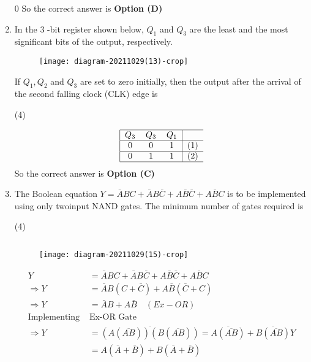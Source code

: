 \begin{enumerate}
\begin{answer}
\begin{figure}[H]
\end{figure}0
So the correct answer is \textbf{Option (D)}
\end{answer}
	\item In the 3 -bit register shown below, $Q_{1}$ and $Q_{3}$ are the least and the most significant bits of the output, respectively.\\
	\begin{figure}[H]
		\centering
		\texttt{[image: diagram-20211029(13)-crop]}
	\end{figure}
	If $Q_{1}, Q_{2}$ and $Q_{3}$ are set to zero initially, then the output after the arrival of the second falling clock (CLK) edge is
\begin{tasks}(4)
\end{tasks}
\begin{answer}
\begin{align*}
\begin{tabular}{|ccc|c}
\hline
$Q_3$&$Q_3$&$Q_1$&$ $\\
\hline
0&0&1&(1)\\
\hline 
0&1&1&(2)\\
\hline
\end{tabular}
\end{align*}
So the correct answer is \textbf{Option (C)}
\end{answer}
	\item The Boolean equation $Y=\bar{A} B C+\bar{A} B \bar{C}+A \bar{B} \bar{C}+A \bar{B} C$ is to be implemented using only twoinput NAND gates. The minimum number of gates required is
\begin{tasks}(4)
\end{tasks}
\begin{answer}$\left. \right. $
\begin{figure}[H]
	\centering
	\texttt{[image: diagram-20211029(15)-crop]}
\end{figure}
\begin{align*}
Y&=\bar{A} B C+\bar{A} B \bar{C}+A \bar{B} \bar{C}+A \bar{B} C \\ \Rightarrow Y&=\bar{A} B(C+\bar{C})+A \bar{B}(\bar{C}+C)\\
\Rightarrow Y&=\bar{A} B+A \bar{B} \quad(E x-O R)\\
\text{Implementing }&\text{Ex-OR Gate}\\
\Rightarrow Y&=\overline{(A(\overline{A B}))(B(\overline{A B}))}=\overline{A(\overline{A B})}+\overline{B(\overline{A B})} Y\\& =A(\bar{A}+\bar{B})+B(\bar{A}+\bar{B})\\

\end{align*}
\end{answer}
\end{enumerate}
